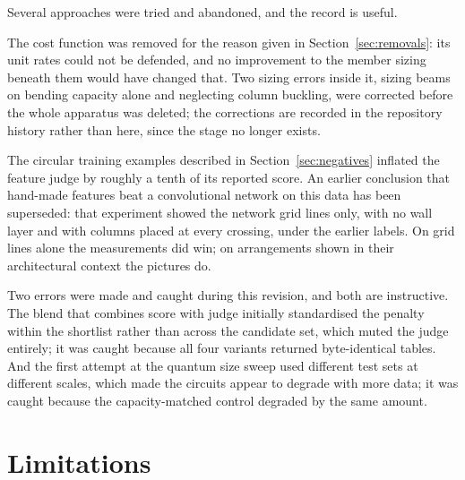 Several approaches were tried and abandoned, and the record is useful.

The cost function was removed for the reason given in
Section~\ref{sec:removals}: its unit rates could not be defended, and no
improvement to the member sizing beneath them would have changed that. Two
sizing errors inside it, sizing beams on bending capacity alone and
neglecting column buckling, were corrected before the whole apparatus was
deleted; the corrections are recorded in the repository history rather than
here, since the stage no longer exists.

The circular training examples described in Section~\ref{sec:negatives}
inflated the feature judge by roughly a tenth of its reported score. An
earlier conclusion that hand-made features beat a convolutional network on
this data has been superseded: that experiment showed the network grid
lines only, with no wall layer and with columns placed at every crossing,
under the earlier labels. On grid lines alone the measurements did win; on
arrangements shown in their architectural context the pictures do.

Two errors were made and caught during this revision, and both are
instructive. The blend that combines score with judge initially
standardised the penalty within the shortlist rather than across the
candidate set, which muted the judge entirely; it was caught because all
four variants returned byte-identical tables. And the first attempt at the
quantum size sweep used different test sets at different scales, which made
the circuits appear to degrade with more data; it was caught because the
capacity-matched control degraded by the same amount.

\section{Limitations}
\label{sec:limitations}

